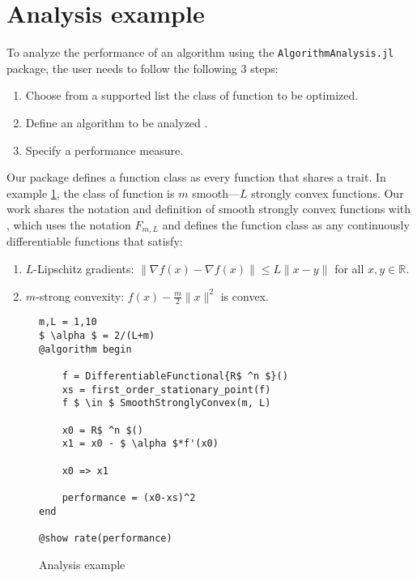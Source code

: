 \section{Analysis example}
To analyze the performance of an algorithm using the \texttt{AlgorithmAnalysis.jl} package, the user needs to follow the following 3 steps:
\begin{enumerate}
	\item Choose from a supported list the class of function to be optimized.
	\item Define an algorithm to be analyzed .
	\item Specify a performance measure.
\end{enumerate}
Our package defines a function class as every function that shares a trait. In example \cref{ex_analysis}, the class of function is $m$ smooth---$L$ strongly convex functions. Our work shares the notation and definition of smooth strongly convex functions with \cite{tutorial}, which uses the notation $F_{m,L}$ and defines the function class as any continuously differentiable functions that satisfy:
\begin{enumerate}
	\item $L$-Lipschitz gradients: $\|\nabla f(x) - \nabla f(x)\| \leq L\|x-y\|$ for all $x, y \in \mathbb{R}$.
	\item $m$-strong convexity: $f(x) - \frac{m}{2}\|x\|^2$ is convex.
\end{enumerate}

\begin{figure}[h!]
	\begin{lstlisting}[mathescape]
m,L = 1,10
$ \alpha $ = 2/(L+m)
@algorithm begin

	f = DifferentiableFunctional{R$ ^n $}() 
	xs = first_order_stationary_point(f)
	f $ \in $ SmoothStronglyConvex(m, L)

	x0 = R$ ^n $()
	x1 = x0 - $ \alpha $*f'(x0)

	x0 => x1

	performance = (x0-xs)^2
end

@show rate(performance)
\end{lstlisting}
\caption{Analysis example}
\label{ex_analysis}
\end{figure}


